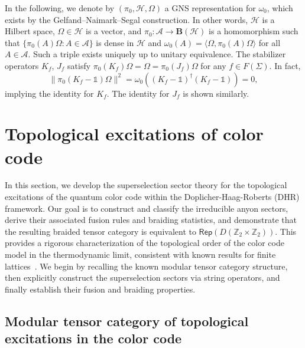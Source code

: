 \documentclass[a4paper,11pt]{article}
\newcommand{\Zbb}{\mathbb{Z}}
\theoremstyle{definition}
\theoremstyle{remark}
\theoremstyle{remark}
\newcommand\Rep {\mathsf{Rep}}
\begin{document}
In the following, we denote by $(\pi_0,\mathcal{H},\Omega)$ a GNS representation for $\omega_0$, which exists by the Gelfand--Naimark--Segal construction.  
In other words, $\mathcal{H}$ is a Hilbert space, $\Omega\in \mathcal{H}$ is a vector, and $\pi_0:\mathcal{A}\to \mathbf{B}(\mathcal{H})$ is a homomorphism such that $\{\pi_0(A)\Omega:A\in\mathcal{A}\}$ is dense in $\mathcal{H}$ and $\omega_0(A) = \langle \Omega,\pi_0(A)\Omega\rangle$ for all $A\in \mathcal{A}$. 
Such a triple exists uniquely up to unitary equivalence. 
The stabilizer operators $K_f$, $J_f$ satisfy $\pi_0(K_f)\Omega=\Omega=\pi_0(J_f)\Omega$ for any $f\in F(\Sigma)$. In fact,  
\begin{equation*}
    \|\pi_0(K_f-\mathds{1})\Omega\|^2 = \omega_0((K_f-\mathds{1})^\dagger (K_f-\mathds{1})) =0, 
\end{equation*}
implying the identity for $K_f$. The identity for $J_f$ is shown similarly. 




\section{Topological excitations of color code}
\label{sec:TO}

In this section, we develop the superselection sector theory for the topological excitations of the quantum color code within the Doplicher-Haag-Roberts (DHR) framework. Our goal is to construct and classify the irreducible anyon sectors, derive their associated fusion rules and braiding statistics, and demonstrate that the resulting braided tensor category is equivalent to $\Rep(D(\Zbb_2 \times \Zbb_2))$. This provides a rigorous characterization of the topological order of the color code model in the thermodynamic limit, consistent with known results for finite lattices~\cite{Bombin2006colorcode,bombin2012universal,Kubica2015color,Kubica2015ColorCode,kesselring2024anyon,Kesselring2018boundaries}. We begin by recalling the known modular tensor category structure, then explicitly construct the superselection sectors via string operators, and finally establish their fusion and braiding properties.


\subsection{Modular tensor category of topological excitations in the color code}
\end{document}
